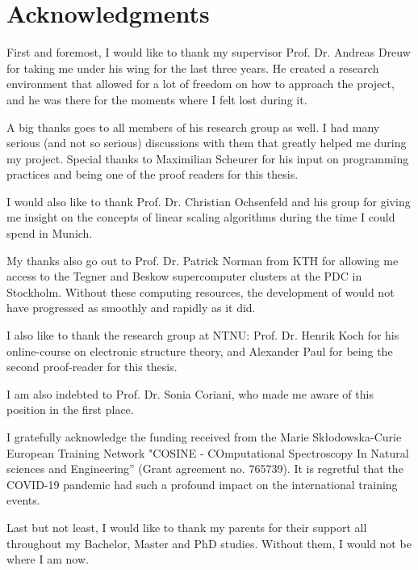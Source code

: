 \chapter*{Acknowledgments}

First and foremost, I would like to thank my supervisor Prof. Dr. Andreas Dreuw for taking me under his wing for the last three years. He created a research environment that allowed for a lot of freedom on how to approach the project, and he was there for the moments where I felt lost during it.

A big thanks goes to all members of his research group as well. I had many serious (and not so serious) discussions with them that greatly helped me during my project. Special thanks to Maximilian Scheurer for his input on programming practices and being one of the proof readers for this thesis.

I would also like to thank Prof. Dr. Christian Ochsenfeld and his group for giving me insight on the concepts of linear scaling algorithms during the time I could spend in Munich.

My thanks also go out to Prof. Dr. Patrick Norman from KTH for allowing me access to the Tegner and Beskow supercomputer clusters at the PDC in Stockholm. Without these computing resources, the development of \mchem{} would not have progressed as smoothly and rapidly as it did. 

I also like to thank the research group at NTNU: Prof. Dr. Henrik Koch for his online-course on electronic structure theory, and Alexander Paul for being the second proof-reader for this thesis. 

I am also indebted to Prof. Dr. Sonia Coriani, who made me aware of this position in the first place.   

I gratefully acknowledge the funding received from the Marie Skłodowska-Curie European Training Network "COSINE - COmputational Spectroscopy In Natural sciences and Engineering” (Grant agreement no. 765739). It is regretful that the COVID-19 pandemic had such a profound impact on the international training events.

Last but not least, I would like to thank my parents for their support all throughout my Bachelor, Master and PhD studies. Without them, I would not be where I am now. 